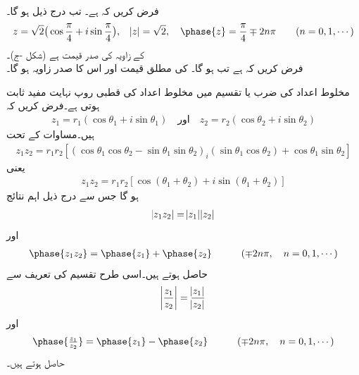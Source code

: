 \quad {}\\
فرض کریں کہ  ہے۔ تب درج ذیل ہو گا۔
\begin{align*}
z=\sqrt{2}\big(\cos \frac{\pi}{4}+i\sin\frac{\pi}{4}\big), \quad \abs{z}=\sqrt{2},\quad \phase{z}=\frac{\pi}{4}\mp2n\pi \quad \quad (n=0,1,\cdots)
\end{align*}
 کے زاویہ کی صدر قیمت  ہے (شکل -ج)۔
\quad {}\\
فرض کریں کہ  ہے تب  ہو گا۔ کی مطلق قیمت  اور اس کا صدر زاویہ  ہو گا۔

مخلوط اعداد کی  ضرب یا تقسیم میں مخلوط اعداد کی قطبی روپ نہایت مفید ثابت ہوتی ہے۔فرض کریں کہ
\begin{align*}
z_1=r_1(\cos\theta_1+i\sin\theta_1)\quad \text{اور}\quad z_2=r_2(\cos \theta_2+i\sin\theta_2)
\end{align*} 
ہیں۔مساوات  کے تحت 
\begin{align*}
z_1z_2=r_1r_2[(\cos\theta_1\cos\theta_2-\sin\theta_1\sin\theta_2)_i(\sin\theta_1\cos\theta_2)+\cos\theta_1\sin\theta_2]
\end{align*}
یعنی
\begin{align}\label{مساوات_مخلوط_ضرب_نتائج_الف}
z_1z_2=r_1r_2[\cos(\theta_1+\theta_2)+i\sin(\theta_1+\theta_2)]
\end{align}
ہو گا جس سے درج ذیل اہم نتائج
\begin{align}\label{مساوات_مخلوط_ضرب_نتائج_ب}
\abs{z_1z_2}=\abs{z_1}\abs{z_2}
\end{align}
اور
\begin{align}\label{مساوات_مخلوط_ضرب_نتائج_پ}
\phase{z_1z_2}=\phase{z_1}+\phase{z_2}\quad \quad\quad (\mp 2n\pi, \quad n=0,1,\cdots)
\end{align}
حاصل ہوتے ہیں۔اسی طرح تقسیم کی تعریف سے 
\begin{align}\label{مساوات_مخلوط_تقسیم_نتائج_الف}
\abs{\frac{z_1}{z_2}}=\frac{\abs{z_1}}{\abs{z_2}}
\end{align}
اور
\begin{align}\label{مساوات_مخلوط_تقسیم_نتائج_ب}
\phase{\tfrac{z_1}{z_2}}=\phase{z_1}-\phase{z_2} \quad \quad\quad (\mp 2n\pi, \quad n=0,1,\cdots)
\end{align}
حاصل ہوتے ہیں۔

